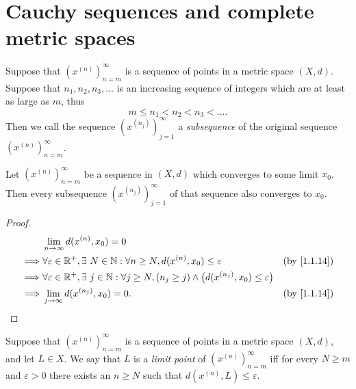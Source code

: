 \section{Cauchy sequences and complete metric spaces}\label{sec:1.4}

\begin{defn}[Subsequences]\label{1.4.1}
  Suppose that \((x^{(n)})_{n = m}^\infty\) is a sequence of points in a metric space \((X, d)\).
  Suppose that \(n_1, n_2, n_3, \dots\) is an increasing sequence of integers which are at least as large as \(m\), thus
  \[
    m \leq n_1 < n_2 < n_3 < \dots.
  \]
  Then we call the sequence \((x^{(n_j)})_{j = 1}^\infty\) a \emph{subsequence} of the original sequence \((x^{(n)})_{n = m}^\infty\).
\end{defn}

\setcounter{thm}{2}
\begin{lem}\label{1.4.3}
  Let \((x^{(n)})_{n = m}^\infty\) be a sequence in \((X, d)\) which converges to some limit \(x_0\).
  Then every subsequence \((x^{(n_j)})_{j = 1}^\infty\) of that sequence also converges to \(x_0\).
\end{lem}

\begin{proof}
  \begin{align*}
             & \lim_{n \to \infty} d(x^{(n)}, x_0) = 0                                                                                                                         \\
    \implies & \forall \varepsilon \in \R^+, \exists\ N \in \N : \forall n \geq N, d(x^{(n)}, x_0) \leq \varepsilon                                & \text{(by \cref{1.1.14})} \\
    \implies & \forall \varepsilon \in \R^+, \exists\ j \in \N : \forall j \geq N, (n_j \geq j) \land \big(d(x^{(n_j)}, x_0) \leq \varepsilon\big)                             \\
    \implies & \lim_{j \to \infty} d(x^{(n_j)}, x_0) = 0.                                                                                          & \text{(by \cref{1.1.14})}
  \end{align*}
\end{proof}

\begin{defn}\label{1.4.4}
  Suppose that \((x^{(n)})_{n = m}^\infty\) is a sequence of points in a metric space \((X, d)\), and let \(L \in X\).
  We say that \(L\) is a \emph{limit point} of \((x^{(n)})_{n = m}^\infty\) iff for every \(N \geq m\) and \(\varepsilon > 0\) there exists an \(n \geq N\) such that \(d(x^{(n)}, L) \leq \varepsilon\).
\end{defn}

